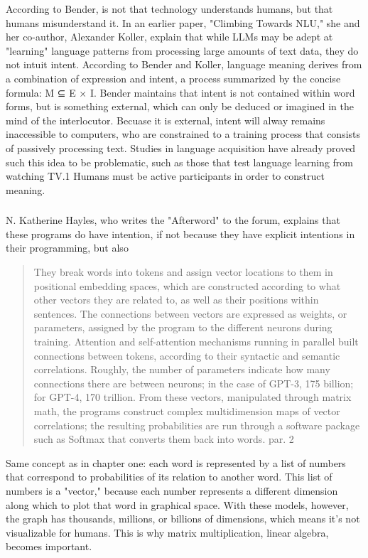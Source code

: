 \documentclass[11pt]{article}
\begin{document}
According to Bender, is not that technology understands humans, but
that humans misunderstand it. In an earlier paper, "Climbing Towards
NLU," she and her co-author, Alexander Koller, explain that while LLMs
may be adept at "learning" language patterns from processing large
amounts of text data, they do not intuit intent. According to Bender
and Koller, language meaning derives from a combination of expression
and intent, a process summarized by the concise formula: M ⊆ E ×
I. Bender maintains that intent is not contained within word forms,
but is something external, which can only be deduced or imagined in
the mind of the interlocutor. Becuase it is external, intent will
alway remains inaccessible to computers, who are constrained to a
training process that consists of passively processing text. Studies
in language acquisition have already proved such this idea to be
problematic, such as those that test language learning from watching
TV.1 Humans must be active participants in order to construct meaning.

\subsubsection{}
\label{sec:orgf2aeab6}
N. Katherine Hayles, who writes the "Afterword" to the forum, explains
that these programs do have intention, if not because they have
explicit intentions in their programming, but also 

\begin{quote}
They break words into tokens and assign vector locations to them in
positional embedding spaces, which are constructed according to what
other vectors they are related to, as well as their positions within
sentences.  The connections between vectors are expressed as weights,
or parameters, assigned by the program to the different neurons during
training.  Attention and self-attention mechanisms running in parallel
built connections between tokens, according to their syntactic and
semantic correlations. Roughly, the number of parameters indicate how
many connections there are between neurons; in the case of GPT-3, 175
billion; for GPT-4, 170 trillion.  From these vectors, manipulated
through matrix math, the programs construct complex multidimension
maps of vector correlations; the resulting probabilities are run
through a software package such as Softmax that converts them back
into words. par. 2
\end{quote}
Same concept as in chapter one: each word is represented by a list of
numbers that correspond to probabilities of its relation to another
word. This list of numbers is a "vector," because each number
represents a different dimension along which to plot that word in
graphical space. With these models, however, the graph has thousands,
millions, or billions of dimensions, which means it's not visualizable
for humans. This is why matrix multiplication, linear algebra, becomes
important. 
\end{document}
